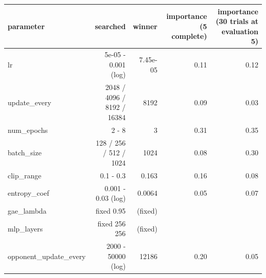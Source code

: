 \begin{tabular}{lrrrr}
\toprule
parameter & searched & winner & importance (5 complete) & importance (30 trials at evaluation 5) \\
\midrule
lr & 5e-05 - 0.001 (log) & 7.45e-05 & 0.11 & 0.12 \\
update\_every & 2048 / 4096 / 8192 / 16384 & 8192 & 0.09 & 0.03 \\
num\_epochs & 2 - 8 & 3 & 0.31 & 0.35 \\
batch\_size & 128 / 256 / 512 / 1024 & 1024 & 0.08 & 0.30 \\
clip\_range & 0.1 - 0.3 & 0.163 & 0.16 & 0.08 \\
entropy\_coef & 0.001 - 0.03 (log) & 0.0064 & 0.05 & 0.07 \\
gae\_lambda & fixed 0.95 & (fixed) &  &  \\
mlp\_layers & fixed 256 256 & (fixed) &  &  \\
opponent\_update\_every & 2000 - 50000 (log) & 12186 & 0.20 & 0.05 \\
\bottomrule
\end{tabular}
